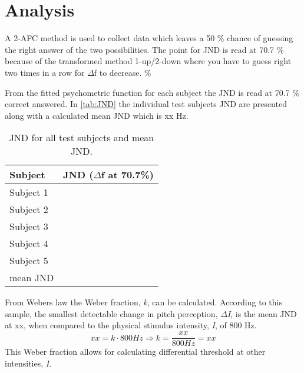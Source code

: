 \section*{Analysis}
A 2-AFC method is used to collect data which leaves a 50 \% chance of guessing the right answer of the two possibilities. The point for JND is read at 70.7 \% because of the transformed method 1-up/2-down where you have to guess right two times in a row for $\Delta$f to decrease.
\%

From the fitted psychometric function for each subject the JND is read at 70.7 \% correct answered. In \autoref{tab:JND} the individual test subjects JND are presented along with a calculated mean JND which is xx Hz. 
%
\begin{table}[H]
	\centering
	\begin{tabular}{l|c}
		Subject     & JND ($\Delta$f at 70.7\%) \\\hline
		Subject 1   &                  \\\hline
		Subject 2   &                  \\\hline
		Subject 3   &                  \\\hline
		Subject 4   &                  \\\hline
		Subject 5   &                  \\\hline
		mean JND &        
	\end{tabular}
	\caption{JND for all test subjects and mean JND.}
	\label{tab:JND}         
\end{table}
\noindent
%
From Webers law the Weber fraction, \textit{k}, can be calculated. According to this sample, the smallest detectable change in pitch perception, \textit{$\Delta$I}, is the mean JND at xx, when compared to the physical stimulus intensity, \textit{I}, of 800 Hz.
% 
\begin{equation}
xx = k \cdot 800 Hz \Rightarrow k = \frac{xx}{800 Hz} = xx
\end{equation}
%
This Weber fraction allows for calculating differential threshold at other intensities, \textit{I}. 
%
